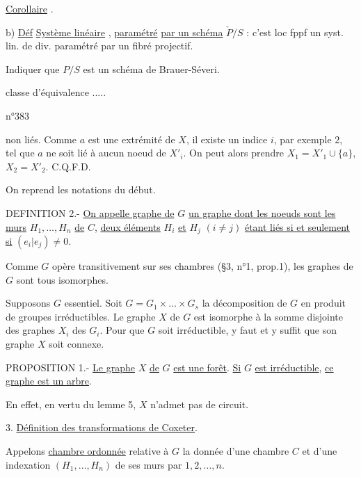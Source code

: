 \uline{Corollaire} .

b) \uline{Déf} \uline{Système linéaire} , \uline{paramétré} \uline{par un schéma} $\check{P}/S$ : c'est loc fppf un syst. lin. de div. paramétré par un fibré projectif.

Indiquer que $P/S$ est un schéma de Brauer-Séveri.

classe d'équivalence .....

\hfill n°383

non liés. Comme $a$ est une extrémité de $X$, il existe un indice $i$, par exemple $2$, tel que $a$ ne soit lié à aucun noeud de $X'_i$. On peut alors prendre $X_1=X'_1\cup\{a\}$, $X_2=X'_2$. C.Q.F.D.

On reprend les notations du début.

DEFINITION 2.- \uline{On appelle graphe de} $G$ \uline{un graphe dont les noeuds sont les murs} $H_1,\ldots,H_n$ \uline{de} $C$, \uline{deux éléments} $H_i$ \uline{et} $H_j$ $(i\ne j)$ \uline{étant liés si et seulement si} $(e_i|e_j)\ne0$.

Comme $G$ opère transitivement sur ses chambres (§3, n°1, prop.1), les graphes de $G$ sont tous isomorphes.

Supposons $G$ essentiel. Soit $G=G_1\times\ldots\times G_s$ la décomposition de $G$ en produit de groupes irréductibles. Le graphe $X$ de $G$ est isomorphe à la somme disjointe des graphes $X_i$ des $G_i$. Pour que $G$ soit irréductible, y faut et y suffit que son graphe $X$ soit connexe.

PROPOSITION 1.- \uline{Le graphe} $X$ \uline{de} $G$ \uline{est une forêt}. \uline{Si} $G$ \uline{est irréductible}, \uline{ce graphe est un arbre}.

En effet, en vertu du lemme 5, $X$ n'admet pas de circuit.

3. \uline{Définition des transformations de Coxeter}.

Appelons \uline{chambre ordonnée} relative à $G$ la donnée d'une chambre $C$ et d'une indexation $(H_1,\ldots,H_n)$ de ses murs par $1,2,\ldots,n$.

